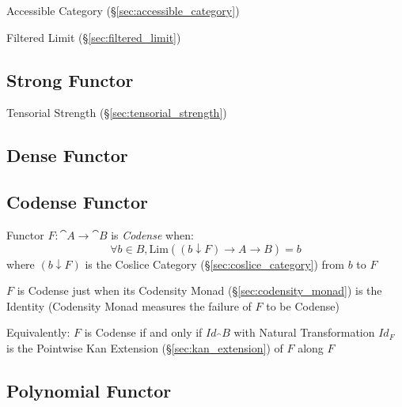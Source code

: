 Accessible Category (\S\ref{sec:accessible_category})

Filtered Limit (\S\ref{sec:filtered_limit})



\subsection{Strong Functor}\label{sec:strong_functor}

Tensorial Strength (\S\ref{sec:tensorial_strength})



\subsection{Dense Functor}\label{sec:dense_functor}

\subsection{Codense Functor}\label{sec:codense_functor}

Functor $F : \cat{A} \rightarrow \cat{B}$ is \emph{Codense} when:
\[
  \forall b \in B,
  \mathrm{Lim}((b \downarrow F) \rightarrow A \rightarrow B) = b
\]
where $(b \downarrow F)$ is the Coslice Category
(\S\ref{sec:coslice_category}) from $b$ to $F$

$F$ is Codense just when its Codensity Monad
(\S\ref{sec:codensity_monad}) is the Identity (Codensity Monad
measures the failure of $F$ to be Codense)

Equivalently: $F$ is Codense if and only if $Id_\cat{B}$ with Natural
Transformation $Id_F$ is the Pointwise Kan Extension
(\S\ref{sec:kan_extension}) of $F$ along $F$



\subsection{Polynomial Functor} \label{sec:polynomial_functor}

